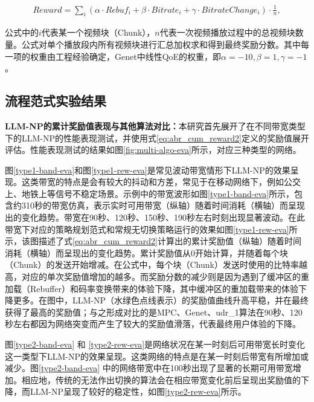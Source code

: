 \begin{equation}
\begin{aligned}
    Reward = \sum_i(\alpha \cdot Rebuf_i + \beta \cdot Bitrate_i + \gamma \cdot BitrateChange_i) \cdot \frac{1}{n},
\end{aligned}
\label{eq:abr_cum_reward2}
\end{equation}

公式中的$i$代表某一个视频块（Chunk），$n$代表一次视频播放过程中的总视频块数量。公式对单个播放段内所有视频块进行汇总加权求和得到最终奖励分数。其中每一项的权重由工程经验确定，Genet\cite{xia2022genet}中线性QoE的权重，即$\alpha = -10, \beta = 1, \gamma = -1$。

\subsection{流程范式实验结果}
\textbf{LLM-NP的累计奖励值表现与其他算法对比：}本研究首先展开了在不同带宽类型下的LLM-NP的性能表现测试，并使用式\eqref{eq:abr_cum_reward2}定义的奖励值展开评估。性能表现测试的结果如图\ref{fig:multi-algo-eva}所示，对应三种类型的网络。


图\ref{type1-band-eva}和图\ref{type1-rew-eva}是常见波动带宽情形下LLM-NP的效果呈现。这类带宽的特点是会有较大的抖动和方差，常见于在移动网络下，例如公交上、地铁上等信号不稳定场景。示例中的带宽波形如图\ref{type1-band-eva}所示，包含约310秒的带宽仿真，表示实时可用带宽（纵轴）随着时间消耗（横轴）而呈现出的变化趋势。带宽在90秒、120秒、150秒、190秒左右时刻出现显著波动。在此带宽下对应的策略规划范式和常规无切换策略运行的效果如图\ref{type1-rew-eva}所示，该图描述了式\eqref{eq:abr_cum_reward2}计算出的累计奖励值（纵轴）随着时间消耗（横轴）而呈现出的变化趋势。累计奖励值从0开始计算，并随着每个块（Chunk）的发送开始增减。在公式中，每个块（Chunk）发送时使用的比特率越高，对应的单次奖励值增加的越多。而奖励分数的减少则是因为遇到了缓冲区的重加载（Rebuffer）和码率变换带来的体验下降，其中缓冲区的重加载带来的体验下降更多。在图中，LLM-NP（水绿色点线表示）的奖励值曲线升高平稳，并在最终获得了最高的奖励值；与之形成对比的是MPC、Genet、udr\_1算法在90秒、120秒左右都因为网络突变而产生了较大的奖励值滑落，代表最终用户体验的下降。

图\ref{type2-band-eva} 和 \ref{type2-rew-eva}是网络状况在某一时刻后可用带宽长时变化这一类型下LLM-NP的效果呈现。这类网络的特点是在某一时刻后带宽有所增加或减少。图\ref{type2-band-eva} 中的网络带宽中在100秒出现了显著的长期可用带宽增加。相应地，传统的无法作出切换的算法会在相应带宽变化前后呈现出奖励值的下降，而LLM-NP呈现了较好的稳定性，如图\ref{type2-rew-eva}所示。

